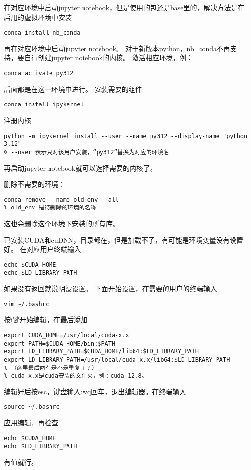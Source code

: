 \documentclass{article}
\begin{document}
在对应环境中启动jupyter notebook，但是使用的包还是base里的，解决方法是在启用的虚拟环境中安装
\begin{lstlisting}
conda install nb_conda
\end{lstlisting}
再在对应环境中启动jupyter notebook。
对于新版本python，nb\_conda不再支持，要自行创建jupyter notebook的内核。
激活相应环境，例：
\begin{lstlisting}
conda activate py312
\end{lstlisting}
后面都是在这一环境中进行。
安装需要的组件
\begin{lstlisting}
conda install ipykernel
\end{lstlisting}
注册内核
\begin{lstlisting}
python -m ipykernel install --user --name py312 --display-name "python 3.12"
% --user 表示只对该用户安装，“py312”替换为对应的环境名
\end{lstlisting}
再启动jupyter notebook就可以选择需要的内核了。

删除不需要的环境：
\begin{lstlisting}
conda remove --name old_env --all
% old_env 是待删除的环境的名称
\end{lstlisting}
这也会删除这个环境下安装的所有库。

已安装CUDA和cuDNN，目录都在，但是加载不了，有可能是环境变量没有设置好。
在对应用户终端输入
\begin{lstlisting}
echo $CUDA_HOME
echo $LD_LIBRARY_PATH
\end{lstlisting}
如果没有返回就说明没设置。
下面开始设置，在需要的用户的终端输入
\begin{lstlisting}
vim ~/.bashrc
\end{lstlisting}
按i键开始编辑，在最后添加
\begin{lstlisting}
export CUDA_HOME=/usr/local/cuda-x.x
export PATH=$CUDA_HOME/bin:$PATH
export LD_LIBRARY_PATH=$CUDA_HOME/lib64:$LD_LIBRARY_PATH
export LD_LIBRARY_PATH=/usr/local/cuda-x.x/lib64:$LD_LIBRARY_PATH
% （这里最后两行是不是重复了？）
% cuda-x.x是cuda安装的文件夹，例：cuda-12.8。
\end{lstlisting}
编辑好后按esc，键盘输入:wq回车，退出编辑器。在终端输入
\begin{lstlisting}
source ~/.bashrc
\end{lstlisting}
应用编辑，再检查
\begin{lstlisting}
echo $CUDA_HOME
echo $LD_LIBRARY_PATH
\end{lstlisting}
有值就行。
\end{document}
